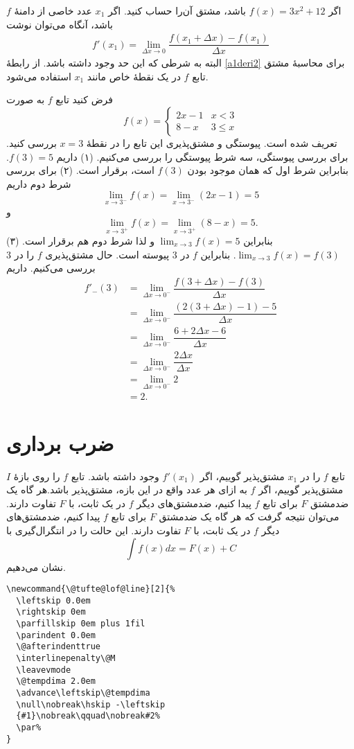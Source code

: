 اگر  $f(x)=3x^2+12$ باشد، مشتق آن‌را حساب کنید.
اگر $x_1$ عدد خاصی از دامنهٔ $f$ باشد، آنگاه می‌توان نوشت
\begin{align}\label{a1deri2}
f'(x_1)=\lim_{\Delta x\rightarrow 0}\dfrac{f(x_1+\Delta x) - f(x_1)}{\Delta x}
\end{align}
البته به شرطی که این حد وجود داشته باشد. از رابطهٔ \eqref{a1deri2} برای محاسبهٔ مشتق تابع $f$ در یک نقطهٔ 
خاص مانند $x_1$ استفاده می‌شود. 


فرض کنید تابع $f$ به صورت 
\[
f(x)=\left\{\begin{array}{ll}
2x-1& x<3\\
8-x & 3\leq x
\end{array} \right.
\]
تعریف شده است. پیوستگی و مشتق‌پذیری این تابع را در نقطهٔ $x=3$ بررسی کنید.
برای بررسی پیوستگی، سه شرط پیوستگی را بررسی می‌کنیم. (۱) داریم $f(3)=5$. بنابراین شرط اول که همان
موجود بودن $f(3)$ است، برقرار است. (۲) برای بررسی شرط دوم داریم
\[
\lim _{x\rightarrow 3^{-}}f(x)=\lim_{x\rightarrow 3^{-}} (2x-1)=5
\]
و 
\[
\lim _{x\rightarrow 3^{+}}f(x)=\lim_{x\rightarrow 3^{+}} (8-x)=5.
\]
بنابراین
 $\lim_{x\rightarrow 3}f(x)=5$
و لذا شرط دوم هم برقرار است. (۳)
$\lim_{x\rightarrow 3}f(x)=f(3)$.
بنابراین $f$ در $3$ پیوسته است. حال مشتق‌پذیری $f$ را در $3$ بررسی می‌کنیم. داریم
\begin{align*}
f'_{-}(3)&=\lim_{\Delta x\rightarrow 0^{-}}\dfrac{f(3+\Delta x)-f(3)}{\Delta x}\\
&=\lim_{\Delta x\rightarrow 0^{-}}\dfrac{(2(3+\Delta x)-1)-5}{\Delta x}\\
&=\lim_{\Delta x\rightarrow 0^{-}}\dfrac{6+2\Delta x-6}{\Delta x}\\
&=\lim_{\Delta x\rightarrow 0^{-}}\dfrac{2\Delta x}{\Delta x}\\
&=\lim_{\Delta x\rightarrow 0^{-}} 2\\
&=2.
\end{align*}
\section{ضرب برداری}
تابع $f$ را در $x_1$ مشتق‌پذیر گوییم، اگر $f'(x_1)$ وجود داشته باشد.
تابع $f$ را روی بازهٔ $I$ مشتق‌پذیر گوییم، اگر $f$ به ازای هر عدد واقع در این بازه، مشتق‌پذیر باشد.هر گاه یک ضدمشتق $F$ برای تابع $f$ پیدا کنیم، ضدمشتق‌های دیگر $f$ در یک ثابت، با $F$ تفاوت دارند.
 می‌توان نتیجه 
 گرفت که هر گاه یک ضدمشتق $F$ برای تابع $f$ پیدا کنیم، ضدمشتق‌های دیگر $f$ در یک ثابت، با $F$ تفاوت دارند. این حالت را در انتگرال‌گیری با 
\[
 \int f(x)dx= F(x)+C
\]
 نشان می‌دهیم.
\begin{lstlisting}[caption={روش به دست آوردن انتگرال نامعین},label={codea1}]  
\newcommand{\@tufte@lof@line}[2]{%
  \leftskip 0.0em
  \rightskip 0em
  \parfillskip 0em plus 1fil
  \parindent 0.0em
  \@afterindenttrue
  \interlinepenalty\@M
  \leavevmode
  \@tempdima 2.0em
  \advance\leftskip\@tempdima
  \null\nobreak\hskip -\leftskip
  {#1}\nobreak\qquad\nobreak#2%
  \par%
}                                        
\end{lstlisting} 
